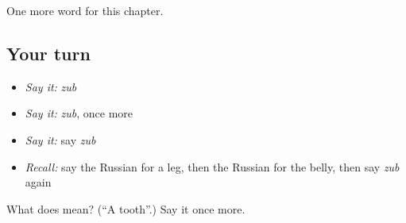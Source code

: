 \begin{grammarlens}[title={What you've built}]
One more word for this chapter.
\end{grammarlens}

\subsection*{Your turn}
\begin{itemize}
\raggedright
  \item \emph{Say it:} \emph{zub}
  \item \emph{Say it:} \emph{zub}, once more
  \item \emph{Say it:} say \emph{zub}
  \item \emph{Recall:} say the Russian for a leg, then the Russian for the belly, then say \emph{zub} again
\end{itemize}

\begin{tcolorbox}[breakable,colback=teal!4,colframe=teal!35!black,title={Before you move on}]
What does  mean? (\textquotedblleft{}A tooth\textquotedblright{}.) Say it once more.
\end{tcolorbox}
